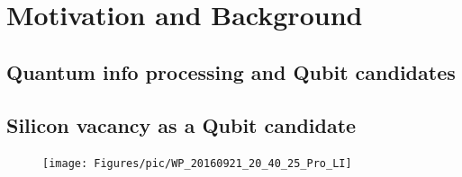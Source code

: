 
\chapter[Motivation and Background]
{Motivation and Background} %

\label{Chapter1} %







\newcommand{\keyword}[1]{\textbf{#1}}
\newcommand{\tabhead}[1]{\textbf{#1}}
\newcommand{\code}[1]{\texttt{#1}}
\newcommand{\file}[1]{\texttt{\bfseries#1}}
\newcommand{\option}[1]{\texttt{\itshape#1}}


\section[Quantum info processing and Qubit candidates]{Quantum info processing and Qubit candidates}



\section[Silicon vacancy as a Qubit candidate]{Silicon vacancy as a Qubit candidate}

\FloatBarrier
\begin{figure}[h]
\centering
\texttt{[image: Figures/pic/WP\_20160921\_20\_40\_25\_Pro\_LI]}
\caption{}
\label{fig:wp20160921204025proli}
\end{figure}
\FloatBarrier


